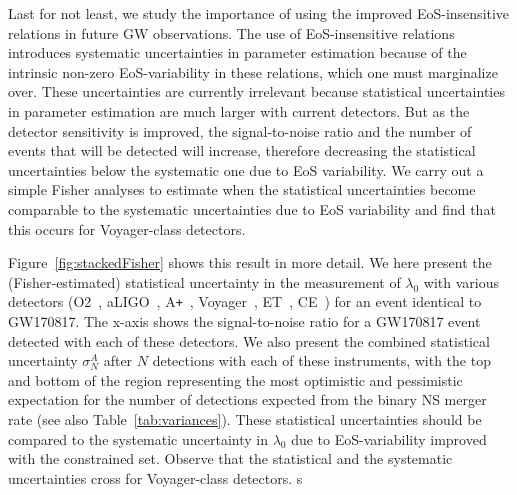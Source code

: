 \documentclass[prd,twocolumn,nofootinbib,superscriptaddress,amsmath,amssymb]{revtex4-1}
\begin{document}
Last for not least, we study the importance of using the improved EoS-insensitive relations in future GW observations. The use of EoS-insensitive relations introduces systematic uncertainties in parameter estimation because of the intrinsic non-zero EoS-variability in these relations, which one must marginalize over. These uncertainties are currently irrelevant because statistical uncertainties in parameter estimation are much larger with current detectors. But as the detector sensitivity is improved, the signal-to-noise ratio and the number of events that will be detected will increase, therefore decreasing the statistical uncertainties below the systematic one due to EoS variability. We carry out a simple Fisher analyses to estimate when the statistical uncertainties become comparable to the systematic uncertainties due to EoS variability and find that this occurs for Voyager-class detectors. 

Figure~\ref{fig:stackedFisher} shows this result in more detail. We here present the (Fisher-estimated) statistical uncertainty in the measurement of $\lambda_{0}$ with various detectors (O2~\cite{aLIGO}, aLIGO~\cite{aLIGO}, A\texttt{+}~\cite{Ap_Voyager_CE}, Voyager~\cite{Ap_Voyager_CE}, ET~\cite{ET}, CE~\cite{Ap_Voyager_CE}) for an event identical to GW170817. The x-axis shows the signal-to-noise ratio for a GW170817 event detected with each of these detectors. We also present the combined statistical uncertainty $\sigma^A_N$ after $N$ detections with each of these instruments, with the top and bottom of the region representing the most optimistic and pessimistic expectation for the number of detections expected from the binary NS merger rate (see also Table~\ref{tab:variances}). These statistical uncertainties should be compared to the systematic uncertainty in $\lambda_{0}$ due to EoS-variability improved with the constrained set. Observe that the statistical and the systematic uncertainties cross for Voyager-class detectors. s
\end{document}
